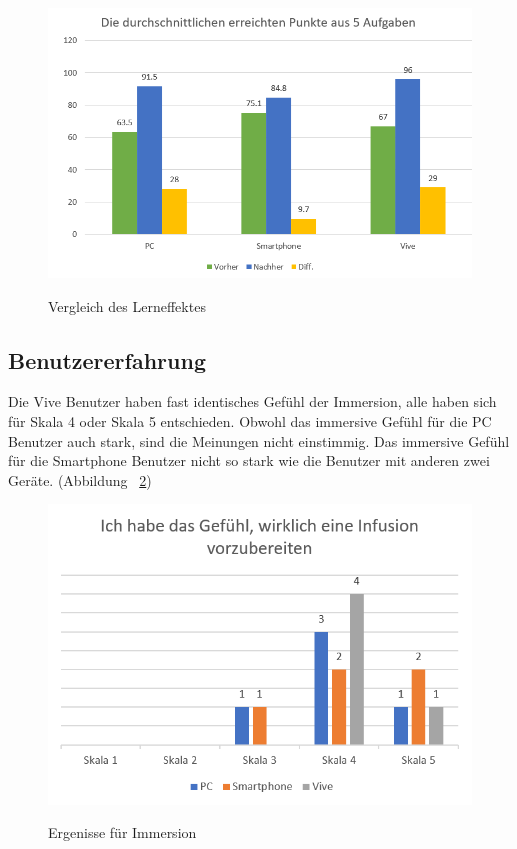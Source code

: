 \begin{figure}[ht]
\vspace*{1em}
\centering
\caption{Vergleich des Lerneffektes}
\includegraphics[width= \textwidth]{images/testErgebnisse.png}
\label{fig:testErgebnisse} 
\end{figure}

\subsection{Benutzererfahrung}

Die Vive Benutzer haben fast identisches Gefühl der Immersion, alle haben sich für Skala 4 oder Skala 5 entschieden. Obwohl das immersive Gefühl für die PC Benutzer auch stark, sind die Meinungen nicht einstimmig. Das immersive Gefühl für die Smartphone Benutzer nicht so stark wie die Benutzer mit anderen zwei Geräte. (Abbildung ~\ref{fig:gefuehlWirklich})

\begin{figure}[ht]
\vspace*{1em}
\centering
\caption{Ergenisse für Immersion}
\includegraphics[width= \textwidth]{images/gefuehlWirklich.png}
\label{fig:gefuehlWirklich} 
\end{figure}

